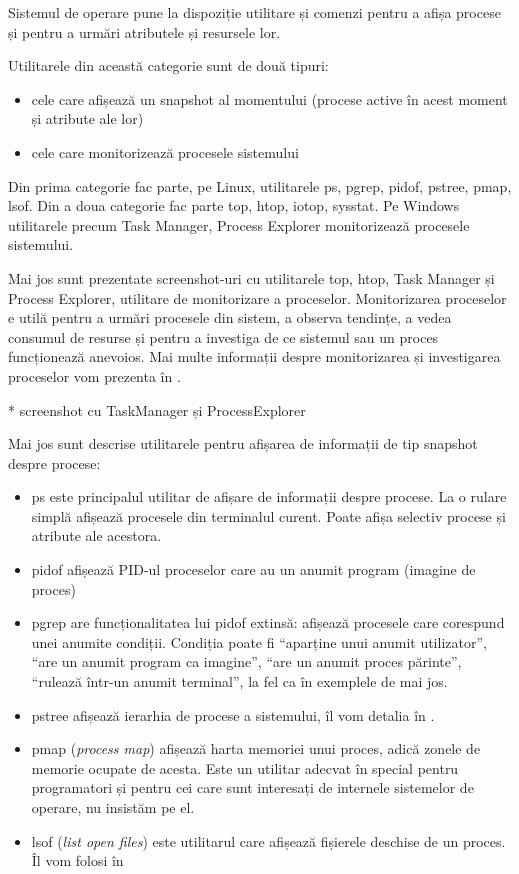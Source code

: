 Sistemul de operare pune la dispoziție utilitare și comenzi pentru a afișa
procese și pentru a urmări atributele și resursele lor.

Utilitarele din această categorie sunt de două tipuri:

\begin{itemize}
	\item cele care afișează un snapshot al momentului (procese active în
		acest moment și atribute ale lor)
	\item cele care monitorizează procesele sistemului
\end{itemize}

Din prima categorie fac parte, pe Linux, utilitarele ps, pgrep, pidof, pstree,
pmap, lsof. Din a doua categorie fac parte top, htop, iotop, sysstat. Pe Windows
utilitarele precum Task Manager, Process Explorer monitorizează procesele
sistemului.

Mai jos sunt prezentate screenshot-uri cu utilitarele top, htop, Task Manager și
Process Explorer, utilitare de monitorizare a proceselor. Monitorizarea
proceselor e utilă pentru a urmări procesele din sistem, a observa tendințe, a
vedea consumul de resurse și pentru a investiga de ce sistemul sau un proces
funcționează anevoios. Mai multe informații despre monitorizarea și investigarea
proceselor vom prezenta în .

* screenshot cu TaskManager și ProcessExplorer

Mai jos sunt descrise utilitarele pentru afișarea de informații de tip snapshot
despre procese:

\begin{itemize}
	\item ps este principalul utilitar de afișare de informații despre
		procese. La o rulare simplă afișează procesele din terminalul
		curent. Poate afișa selectiv procese și atribute ale acestora.
	\item pidof afișează PID-ul proceselor care au un anumit program
		(imagine de proces)
	\item pgrep are funcționalitatea lui pidof extinsă: afișează procesele
		care corespund unei anumite condiții. Condiția poate fi
		“aparține unui anumit utilizator”, “are un anumit program ca
		imagine”, “are un anumit proces părinte”, “rulează într-un
		anumit terminal”, la fel ca în exemplele de mai jos.
	\item pstree afișează ierarhia de procese a sistemului, îl vom detalia
		în .
	\item pmap (\textit{process map}) afișează harta memoriei unui proces, adică
		zonele de memorie ocupate de acesta. Este un utilitar adecvat în
		special pentru programatori și pentru cei care sunt interesați
		de internele sistemelor de operare, nu insistăm pe el.
	\item lsof (\textit{list open files}) este utilitarul care afișează
		fișierele deschise de un proces. Îl vom folosi în
\end{itemize}

